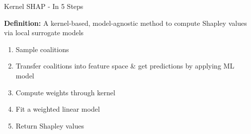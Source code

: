 \documentclass[11pt,compress,t,notes=noshow, aspectratio=169, xcolor=table]{beamer}
\begin{document}
\begin{vbframe}{Kernel SHAP - In 5 Steps}

\textbf{Definition:} A kernel-based, model-agnostic method to compute Shapley values via local surrogate models\\
\vspace{1cm}
\begin{enumerate}
    \item Sample coalitions 
    
    \item Transfer coalitions into feature space \& get predictions by applying ML model
    
    
    \item Compute weights through kernel
    
    \item Fit a weighted linear model 

    \item Return Shapley values
    
    
\end{enumerate}

\end{vbframe}
\end{document}
